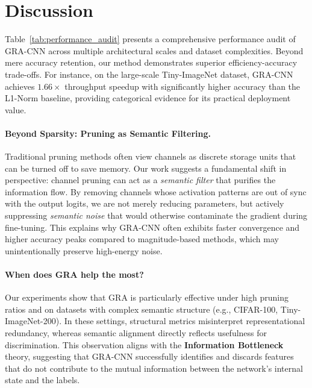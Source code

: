 \documentclass[sn-mathphys,Numbered]{sn-jnl}
\begin{document}
\section{Discussion}
\label{sec:discussion}



Table~\ref{tab:performance_audit} presents a comprehensive performance audit of GRA-CNN across multiple architectural scales and dataset complexities. Beyond mere accuracy retention, our method demonstrates superior efficiency-accuracy trade-offs. For instance, on the large-scale Tiny-ImageNet dataset, GRA-CNN achieves $1.66\times$ throughput speedup with significantly higher accuracy than the L1-Norm baseline, providing categorical evidence for its practical deployment value.

\paragraph{Beyond Sparsity: Pruning as Semantic Filtering.}
Traditional pruning methods often view channels as discrete storage units that can be turned off to save memory. Our work suggests a fundamental shift in perspective: channel pruning can act as a \emph{semantic filter} that purifies the information flow. By removing channels whose activation patterns are out of sync with the output logits, we are not merely reducing parameters, but actively suppressing \emph{semantic noise} that would otherwise contaminate the gradient during fine-tuning. This explains why GRA-CNN often exhibits faster convergence and higher accuracy peaks compared to magnitude-based methods, which may unintentionally preserve high-energy noise.

\paragraph{When does GRA help the most?}
Our experiments show that GRA is particularly effective under high pruning ratios and on datasets with complex semantic structure (e.g., CIFAR-100, Tiny-ImageNet-200). In these settings, structural metrics misinterpret representational redundancy, whereas semantic alignment directly reflects usefulness for discrimination. This observation aligns with the \textbf{Information Bottleneck} theory, suggesting that GRA-CNN successfully identifies and discards features that do not contribute to the mutual information between the network's internal state and the labels.
\end{document}
